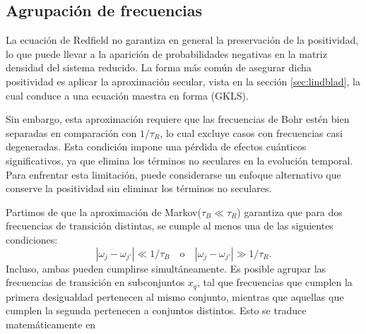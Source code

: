\subsection{Agrupación de frecuencias}
La ecuación de Redfield no garantiza en general la preservación de la positividad, lo que puede llevar a la aparición de probabilidades negativas en la matriz densidad del sistema reducido. La forma más común de asegurar dicha positividad es aplicar la aproximación secular, vista en la sección \ref{sec:lindblad}, la cual conduce a una ecuación maestra en forma (GKLS).

Sin embargo, esta aproximación requiere que las frecuencias de Bohr estén bien separadas en comparación con \( 1/\tau_R \), lo cual excluye casos con frecuencias casi degeneradas. Esta condición impone una pérdida de efectos cuánticos significativos, ya que elimina los términos no seculares en la evolución temporal\cite{trushechkin2021unified}. Para enfrentar esta limitación, puede considerarse un enfoque alternativo que conserve la positividad sin eliminar los términos no seculares. 

Partimos de que la aproximación de Markov($\tau_{B} \ll \tau_{R}$) garantiza que para dos frecuencias de transición distintas, se cumple al menos una de las siguientes condiciones:
\[
|\omega_j - \omega_{j'}| \ll 1/\tau_B \quad \text{o} \quad |\omega_j - \omega_{j'}| \gg 1/\tau_R.
\]
Incluso, ambas pueden cumplirse simultáneamente. Es posible agrupar las frecuencias de transición en subconjuntos \( x_q \), tal que frecuencias que cumplen la primera desigualdad pertenecen al mismo conjunto, mientras que aquellas que cumplen la segunda pertenecen a conjuntos distintos. Esto se traduce matemáticamente en


